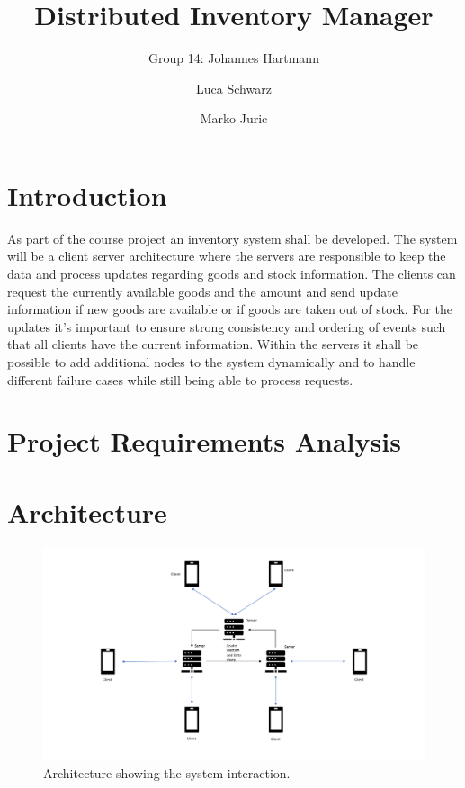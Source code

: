 \documentclass[runningheads]{llncs}
\begin{document}
%
\title{Distributed Inventory Manager}

\author{Group 14: Johannes Hartmann \and Luca Schwarz \and Marko Juric}

\institute{}
%
\maketitle              %

\section{Introduction}

As part of the course project an inventory system shall be developed. The system will be a client server architecture where the servers are responsible to keep the data and process updates regarding goods and stock information. The clients can request the currently available goods and the amount and send update information if new goods are available or if goods are taken out of stock. For the updates it’s important to ensure strong consistency and ordering of events such that all clients have the current information. Within the servers it shall be possible to add additional nodes to the system dynamically and to handle different failure cases while still being able to process requests.


\section{Project Requirements Analysis}



\section{Architecture}

\begin{figure}
\includegraphics[width=\textwidth]{images/Architecture.png}
\caption{Architecture showing the system interaction.} \label{fig1}
\end{figure}



%
%
%
% 
% 
%
\end{document}

